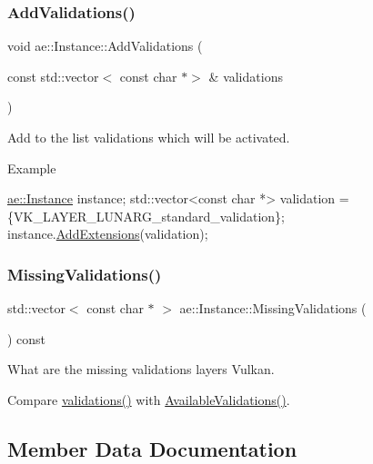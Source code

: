 \subsubsection{\texorpdfstring{Add\+Validations()}{AddValidations()}}
{\footnotesize\ttfamily void ae\+::\+Instance\+::\+Add\+Validations (\begin{DoxyParamCaption}\item[{const std\+::vector$<$ const char $\ast$$>$ \&}]{validations }\end{DoxyParamCaption})\hspace{0.3cm}{\ttfamily [noexcept]}}



Add to the list validations which will be activated. 

Example 
\begin{DoxyCode}
\hyperlink{classae_1_1_instance}{ae::Instance} instance;
std::vector<const char *> validation =
\{VK\_LAYER\_LUNARG\_standard\_validation\};
instance.\hyperlink{classae_1_1_instance_a880ed1eaf9b821ac616865821a5f15ef}{AddExtensions}(validation);
\end{DoxyCode}
 \hypertarget{classae_1_1_instance_aa76edbae91362fadb47c743b6f4298be}{}\label{classae_1_1_instance_aa76edbae91362fadb47c743b6f4298be} 
\subsubsection{\texorpdfstring{Missing\+Validations()}{MissingValidations()}}
{\footnotesize\ttfamily std\+::vector$<$ const char $\ast$ $>$ ae\+::\+Instance\+::\+Missing\+Validations (\begin{DoxyParamCaption}{ }\end{DoxyParamCaption}) const\hspace{0.3cm}{\ttfamily [noexcept]}}



What are the missing validations layers Vulkan. 

Compare \hyperlink{classae_1_1_instance_a356579044ea77c9cc14723f0b7d7a52d}{validations()} with \hyperlink{classae_1_1_instance_a6b46129d8c0b5d204eab1a1cecb5b221}{Available\+Validations()}. 

\subsection{Member Data Documentation}
\hypertarget{classae_1_1_instance_a51fa0c0f46de73754c52841fc458d4ac}{}\label{classae_1_1_instance_a51fa0c0f46de73754c52841fc458d4ac} 
